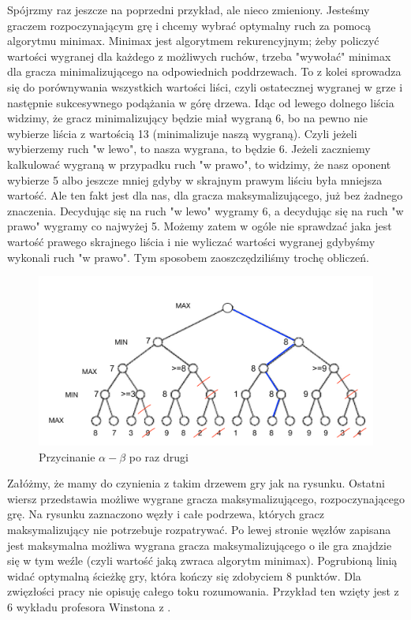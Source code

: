\documentclass[licencjacka]{pracamgr}
\begin{document}
Spójrzmy raz jeszcze na poprzedni przykład, ale nieco zmieniony. Jesteśmy graczem rozpoczynającym grę i chcemy wybrać optymalny ruch za pomocą algorytmu minimax. Minimax jest algorytmem rekurencyjnym; żeby policzyć wartości wygranej dla każdego z możliwych ruchów, trzeba "wywołać" minimax dla gracza minimalizującego na odpowiednich poddrzewach. To z kolei sprowadza się do porównywania wszystkich wartości liści, czyli ostatecznej wygranej w grze i następnie sukcesywnego podążania w górę drzewa.  Idąc od lewego dolnego liścia widzimy, że gracz minimalizujący będzie miał wygraną 6, bo  na pewno nie wybierze liścia z wartością 13 (minimalizuje naszą wygraną). Czyli jeżeli wybierzemy ruch "w lewo", to nasza wygrana, to będzie 6. Jeżeli zaczniemy kalkulować wygraną w przypadku ruch "w prawo", to widzimy, że nasz oponent wybierze 5 albo jeszcze mniej gdyby w skrajnym prawym liściu była mniejsza wartość. Ale ten fakt jest dla nas, dla gracza maksymalizującego, już bez żadnego znaczenia. Decydując się na ruch "w lewo" wygramy 6, a decydując się na ruch "w prawo" wygramy co najwyżej 5. Możemy zatem w ogóle nie sprawdzać jaka jest wartość prawego skrajnego liścia i nie wyliczać wartości wygranej gdybyśmy wykonali ruch "w prawo". Tym sposobem zaoszczędziliśmy trochę obliczeń. 
\begin{flushleft}
	\begin{figure}
	\includegraphics [scale=0.45] {big_tree2.png}
	\caption{Przycinanie $\alpha - \beta$ po raz drugi}
	\label{Rys4}
	\end{figure}
\end{flushleft}
Załóżmy, że mamy do czynienia z takim drzewem gry jak na rysunku. Ostatni wiersz przedstawia możliwe wygrane gracza maksymalizującego, rozpoczynającego grę. Na rysunku zaznaczono węzły i całe podrzewa, których gracz maksymalizujący nie potrzebuje rozpatrywać. Po lewej stronie węzłów zapisana jest maksymalna możliwa wygrana gracza maksymalizującego o ile gra znajdzie się w tym weźle (czyli wartość jaką zwraca algorytm minimax). Pogrubioną linią widać optymalną ścieżkę gry, która kończy się zdobyciem 8 punktów. Dla zwięzłości pracy nie opisuję całego toku rozumowania. Przykład ten wzięty jest z 6 wykładu profesora Winstona z \cite{MIT_AI}.\\
\end{document}
